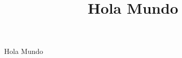 \documentclass{article}
\begin{document}
\title{Hola Mundo}
\author{}
\date{}

\maketitle

Hola Mundo
\end{document}

